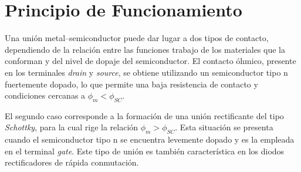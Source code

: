 \documentclass[a4paper]{article}
\begin{document}



\section{Principio de Funcionamiento}

Una unión metal–semiconductor puede dar lugar a dos tipos de contacto, dependiendo de la relación entre las funciones trabajo de los materiales que la conforman y del nivel de dopaje del semiconductor. El contacto óhmico, presente en los terminales \textit{drain} y \textit{source}, se obtiene utilizando un semiconductor tipo n fuertemente dopado, lo que permite una baja resistencia de contacto y condiciones cercanas a $\phi_m < \phi_{SC}$.

El segundo caso corresponde a la formación de una unión rectificante del tipo \textit{Schottky}, para la cual rige la relación $\phi_m > \phi_{SC}$. Esta situación se presenta cuando el semiconductor tipo n se encuentra levemente dopado y es la empleada en el terminal \textit{gate}. Este tipo de unión es también característica en los diodos rectificadores de rápida conmutación.
\end{document}
